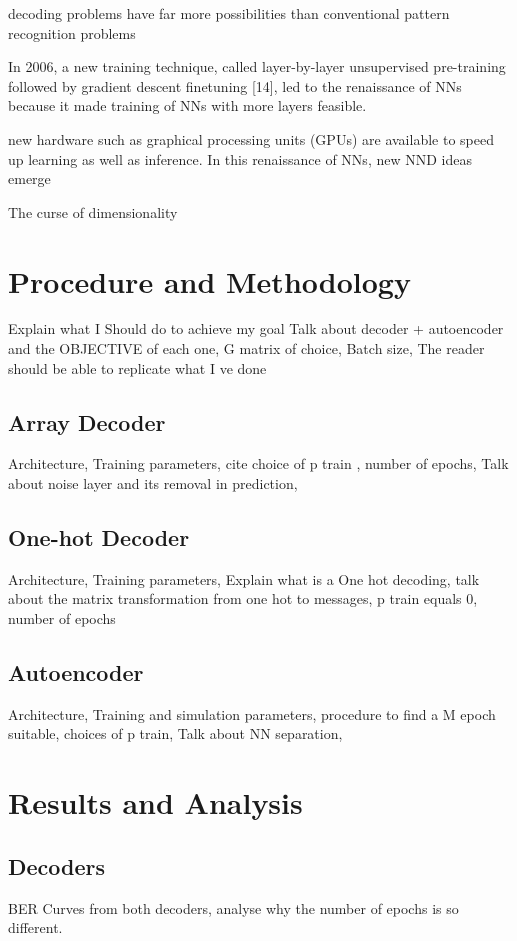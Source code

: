 \documentclass[conference]{IEEEtran}
\begin{document}
decoding problems have far more possibilities than conventional pattern recognition problems

In 2006, a new training technique, called layer-by-layer
unsupervised pre-training followed by gradient descent finetuning [14], led to the renaissance of NNs because it made
training of NNs with more layers feasible.

new hardware such as graphical processing units (GPUs) are available
to speed up learning as well as inference. In this renaissance
of NNs, new NND ideas emerge

The curse of dimensionality


\section{Procedure and Methodology}
Explain what I Should do to achieve my goal
Talk about decoder + autoencoder and the OBJECTIVE of each one, G matrix of choice, Batch size, The reader should be able to replicate what I ve done

\subsection{Array Decoder}
Architecture, Training parameters, cite choice of p train \cite{b13}, number of epochs, Talk about noise layer and its removal in prediction, 

\subsection{One-hot Decoder}
Architecture, Training parameters, Explain what is a One hot decoding, talk about the matrix transformation from one hot to messages, p train equals 0, number of epochs

\subsection{Autoencoder}
Architecture, Training and simulation parameters, procedure to find a M epoch suitable, choices of p train, Talk about NN separation, 


\section{Results and Analysis}

\subsection{Decoders}
BER Curves from both decoders, analyse why the number of epochs is so different. 
\end{document}
